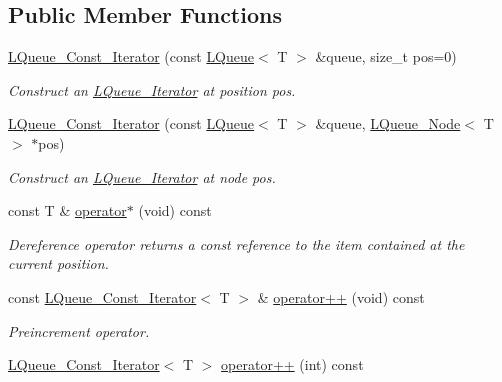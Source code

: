 \subsection*{Public Member Functions}
\begin{DoxyCompactItemize}
\item 
\hyperlink{classMadara_1_1Utility_1_1LQueue__Const__Iterator_a92e4af1549680786febdf55a2823a038}{LQueue\_\-Const\_\-Iterator} (const \hyperlink{classMadara_1_1Utility_1_1LQueue}{LQueue}$<$ T $>$ \&queue, size\_\-t pos=0)
\begin{DoxyCompactList}\small\item\em Construct an \hyperlink{classMadara_1_1Utility_1_1LQueue__Iterator}{LQueue\_\-Iterator} at position pos. \item\end{DoxyCompactList}\item 
\hyperlink{classMadara_1_1Utility_1_1LQueue__Const__Iterator_a1e26e3e06b93c3e5e9d3d754f6ff4783}{LQueue\_\-Const\_\-Iterator} (const \hyperlink{classMadara_1_1Utility_1_1LQueue}{LQueue}$<$ T $>$ \&queue, \hyperlink{classMadara_1_1Utility_1_1LQueue__Node}{LQueue\_\-Node}$<$ T $>$ $\ast$pos)
\begin{DoxyCompactList}\small\item\em Construct an \hyperlink{classMadara_1_1Utility_1_1LQueue__Iterator}{LQueue\_\-Iterator} at node pos. \item\end{DoxyCompactList}\item 
const T \& \hyperlink{classMadara_1_1Utility_1_1LQueue__Const__Iterator_a4a5090a8aa6804b373c92aebce45fe40}{operator$\ast$} (void) const 
\begin{DoxyCompactList}\small\item\em Dereference operator returns a const reference to the item contained at the current position. \item\end{DoxyCompactList}\item 
const \hyperlink{classMadara_1_1Utility_1_1LQueue__Const__Iterator}{LQueue\_\-Const\_\-Iterator}$<$ T $>$ \& \hyperlink{classMadara_1_1Utility_1_1LQueue__Const__Iterator_a08ead8f5b011099138815c2647540c00}{operator++} (void) const 
\begin{DoxyCompactList}\small\item\em Preincrement operator. \item\end{DoxyCompactList}\item 
\hyperlink{classMadara_1_1Utility_1_1LQueue__Const__Iterator}{LQueue\_\-Const\_\-Iterator}$<$ T $>$ \hyperlink{classMadara_1_1Utility_1_1LQueue__Const__Iterator_a2c94621bdd5e4c39c81a9676ec4dfbbf}{operator++} (int) const 

\end{DoxyCompactItemize}
